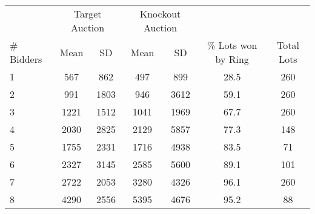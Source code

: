 \begin{tabular}{lcccccc}
\toprule
& \multicolumn{2}{c}{Target Auction} & \multicolumn{2}{c}{Knockout Auction} & & \\
\cmidrule(lr){2-3}\cmidrule(lr){4-5}
\# Bidders & Mean & SD & Mean & SD & \% Lots won by Ring & Total Lots \\ \midrule
1 & 567 & 862 & 497 & 899 & 28.5 & 260 \\
2 & 991 & 1803 & 946 & 3612 & 59.1 & 260 \\
3 & 1221 & 1512 & 1041 & 1969 & 67.7 & 260 \\
4 & 2030 & 2825 & 2129 & 5857 & 77.3 & 148 \\
5 & 1755 & 2331 & 1716 & 4938 & 83.5 & 71 \\
6 & 2327 & 3145 & 2585 & 5600 & 89.1 & 101 \\
7 & 2722 & 2053 & 3280 & 4326 & 96.1 & 260 \\
8 & 4290 & 2556 & 5395 & 4676 & 95.2 & 88 \\
\bottomrule
\end{tabular}
